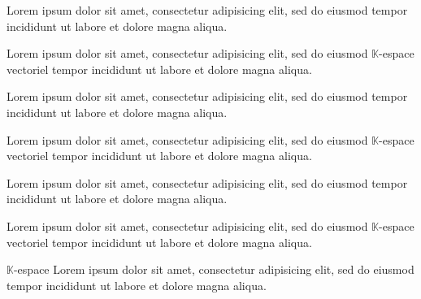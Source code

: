 \documentclass{amsbook}
\begin{document}
Lorem ipsum dolor sit amet, consectetur adipisicing elit, sed do eiusmod tempor incididunt ut labore et dolore magna aliqua.

Lorem ipsum dolor sit amet, consectetur adipisicing elit, sed do eiusmod 
$\mathbb{K}$\hbox{-}espace vectoriel tempor incididunt ut labore et dolore magna aliqua.

Lorem ipsum dolor sit amet, consectetur adipisicing elit, sed do eiusmod tempor incididunt ut labore et dolore magna aliqua.

Lorem ipsum dolor sit amet, consectetur adipisicing elit, sed do eiusmod
$\mathbb{K}$\nobreakdashes-espace vectoriel tempor incididunt ut labore et dolore magna aliqua.

Lorem ipsum dolor sit amet, consectetur adipisicing elit, sed do eiusmod tempor incididunt ut labore et dolore magna aliqua.

Lorem ipsum dolor sit amet, consectetur adipisicing elit, sed do eiusmod
$\mathbb{K}$\nobreakdashes-es\-pace vectoriel tempor incididunt ut labore et dolore magna aliqua.

$\mathbb{K}$\nobreakdashes-es\-pace Lorem ipsum dolor sit amet, consectetur adipisicing elit, sed do eiusmod tempor incididunt ut labore et dolore magna aliqua.
\end{document}
